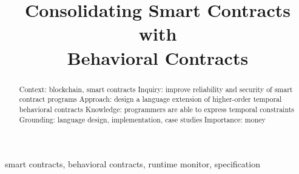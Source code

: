 \documentclass[10pt,conference]{IEEEtran}
\begin{document}

\title{Consolidating Smart Contracts with\\ Behavioral Contracts}

\author{ }


\maketitle


\begin{abstract}
  Context: blockchain, smart contracts
    Inquiry: improve reliability and security of smart contract programs
    Approach: design a language extension of higher-order temporal behavioral contracts
    Knowledge: programmers are able to express temporal constraints
    Grounding: language design, implementation, case studies
    Importance: money
\end{abstract}

\begin{IEEEkeywords}
  smart contracts, behavioral contracts, runtime monitor, specification
\end{IEEEkeywords}














\end{document}
